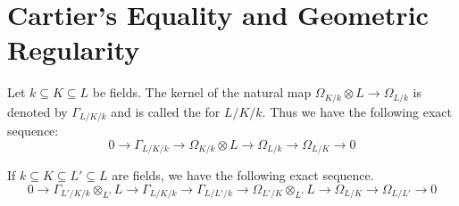 \documentclass[../main]{subfiles}
\begin{document}
\section{Cartier's Equality and Geometric Regularity}\label{sec:39}
\newparagraph Let $k \subseteq K \subseteq L$ be fields. The kernel of the natural map \newline $\Omega_{K/k} \otimes L \longrightarrow \Omega_{L/k}$ is denoted by $\Gamma_{L/K/k}$ and is called the  for $L/K/k$. Thus we have the following exact sequence:
\[
0 \longrightarrow \Gamma_{L/K/k} \longrightarrow \Omega_{K/k} \otimes L \longrightarrow \Omega_{L/k} \longrightarrow \Omega_{L/K} \longrightarrow 0
\]

\begin{lemma}
If $k \subseteq K \subseteq L' \subseteq L$ are fields, we have the following exact sequence.
\[
0  \longrightarrow \Gamma_{L'/K/k} \otimes_{L'} L \longrightarrow \Gamma_{L/K/k} \longrightarrow \Gamma_{L/L'/k} \longrightarrow \Omega_{L'/K} \otimes_{L'} L   \longrightarrow \Omega_{L/K} \longrightarrow \Omega_{L/L'} \longrightarrow 0
\]
\end{lemma}
\end{document}
